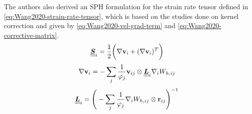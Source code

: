 The authors also derived an SPH formulation for the strain rate tensor defined in \ref{eq:Wang2020-strain-rate-tensor}, which is based on the studies done on kernel correction \parencite{bonet1999variational, khayyer2008corrected} and given by \ref{eq:Wang2020-vel-grad-term} and \ref{eq:Wang2020-corrective-matrix}. 
\begin{equation}
	\underline{\underline{\bm{S}}}_i = \frac{1}{2} \bigg( \nabla \mathbf{v}_i + (\nabla \mathbf{v}_i)^T \bigg)
	\label{eq:Wang2020-strain-rate-tensor}
\end{equation}
\begin{equation}
	\nabla \mathbf{v}_i = - \sum_j \frac{1}{\varphi_j} \mathbf{v}_{ij} \otimes \underline{\underline{\bm{L}}}_i \nabla_{i} W_{h, ij}
	\label{eq:Wang2020-vel-grad-term}
\end{equation}
\begin{equation}
	\underline{\underline{\bm{L}}}_i = \Bigg(- \sum_j \frac{1}{\varphi_j} \nabla_{i} W_{h, ij} \otimes \mathbf{r}_{ij} \Bigg)^{-1}
	\label{eq:Wang2020-corrective-matrix}
\end{equation}


